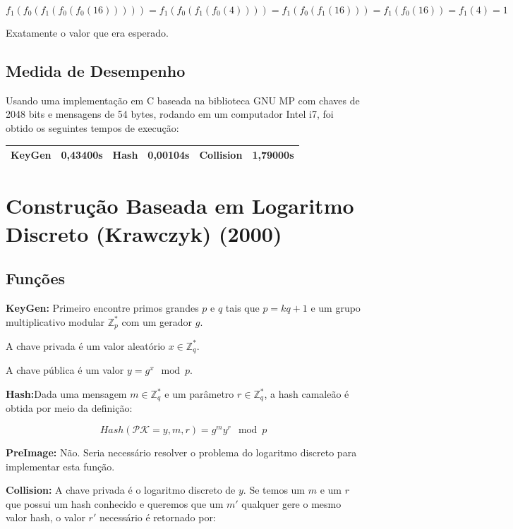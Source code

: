 \documentclass[a4paper]{article}
\begin{document}
 $$
 f_1(f_0(f_1(f_0(f_0(16))))) = f_1(f_0(f_1(f_0(4)))) = f_1(f_0(f_1(16))) =
 f_1(f_0(16)) = f_1(4) = 1
 $$
 
 Exatamente o valor que era esperado.
 
 \subsection{Medida de Desempenho}
 
 Usando uma implementação em C baseada na biblioteca GNU MP com chaves
 de 2048 bits e mensagens de 54 bytes, rodando em um computador Intel
 i7, foi obtido os seguintes tempos de execução:
 
 \begin{center}
 \begin{tabular}{|c|c|c|c|c|c|}
 \hline
 KeyGen & 0,43400s & Hash & 0,00104s & Collision & 1,79000s\\
 \hline
 \end{tabular}
 \end{center}
 
 
 \section{Construção Baseada em Logaritmo Discreto (Krawczyk) (2000)
 \cite{krawczyk}}
 
 \subsection{Funções}
 
 \textbf{KeyGen: }Primeiro encontre primos grandes $p$ e $q$ tais que
 $p = kq+1$ e um grupo multiplicativo modular $\mathbb{Z}^{*}_p$ com um
 gerador $g$.
 
 A chave privada é um valor aleatório $x \in \mathbb{Z}^{*}_q$.
 
 A chave pública é um valor $y = g^x \mod p$.
 
 \textbf{Hash:}Dada uma mensagem $m \in \mathbb{Z}^{*}_q$ e um
 parâmetro $r\in \mathbb{Z}^{*}_q$, a hash camaleão é obtida por meio
 da definição:
 
 $$
 Hash(\mathcal{PK}=y, m, r) = g^my^r \mod p
 $$
 
 \textbf{PreImage:} Não. Seria necessário resolver o problema do
 logaritmo discreto para implementar esta função.
 
 \textbf{Collision:} A chave privada é o logaritmo discreto de $y$. Se
 temos um $m$ e um $r$ que possui um hash conhecido e queremos que um
 $m'$ qualquer gere o mesmo valor hash, o valor $r'$ necessário é
 retornado por:
 
\end{document}
